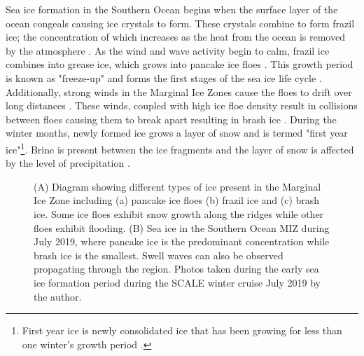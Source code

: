 Sea ice formation in the Southern Ocean begins when the surface layer of the ocean congeals causing ice crystals to form. These crystals combine to form frazil ice; the concentration of which increases as the heat from the ocean is removed by the atmosphere \cite{arrigo2004large}. As the wind and wave activity begin to calm, frazil ice combines into grease ice, which grows into pancake ice floes \cite{arrigo2004large}. This growth period is known as "freeze-up" and forms the first stages of the sea ice life cycle \cite{barber2005microwave}. Additionally, strong winds in the Marginal Ice Zones cause the floes to drift over long distances \cite{alberello2019drift}. These winds, coupled with high ice floe density result in collisions between floes causing them to break apart \cite{STEER2008933} resulting in brash ice \cite{icedefinition1992}.  During the winter months, newly formed ice grows a layer of snow \cite{barber2005microwave} and is termed "first year ice"\footnote{First year ice is newly consolidated ice that has been growing for less than one winter's growth period \cite{icedefinition1992}.}. Brine is present between the ice fragments and the layer of snow is affected by the level of precipitation \cite{barber2005microwave}.\par

\begin{figure}[H]
	\centering
	\begin{subfigure}[t]{0.5\textwidth}

	\label{fig:Ice Types}
	\end{subfigure}%
	\begin{subfigure}[t]{0.5\textwidth}
		\label{fig:MIZICE}
	\end{subfigure}%
	\caption{(A) Diagram showing different types of ice present in the Marginal Ice Zone including (a) pancake ice floes (b) frazil ice and (c) brash ice. Some ice floes exhibit snow growth along the ridges while other floes exhibit flooding. (B) Sea ice in the Southern Ocean MIZ during July 2019, where pancake ice is the predominant  concentration while brash ice is the smallest. Swell waves can also be observed propagating through the region. Photos taken during the early sea ice formation period during the SCALE winter cruise July 2019 by the author.}
	\label{fig:ridging}
\end{figure}


